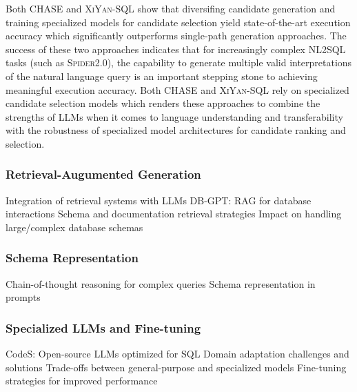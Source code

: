 \documentclass{article}
\begin{document}
Both CHASE and \textsc{XiYan-SQL} show that diversifing candidate generation and training specialized models for candidate
selection yield state-of-the-art execution accuracy which significantly outperforms single-path generation approaches.
The success of these two approaches indicates that for increasingly complex NL2SQL tasks (such as \textsc{Spider2.0}),
the capability to generate multiple valid interpretations of the natural language query is an important stepping stone
to achieving meaningful execution accuracy. Both CHASE and \textsc{XiYan-SQL} rely on specialized candidate selection
models which renders these approaches to combine the strengths of LLMs when it comes to language understanding and
transferability with the robustness of specialized model architectures for candidate ranking and selection.

\vspace{5cm}


\subsubsection{Retrieval-Augumented Generation}

Integration of retrieval systems with LLMs
DB-GPT: RAG for database interactions \citep{DBGPT}
Schema and documentation retrieval strategies
Impact on handling large/complex database schemas

\subsubsection{Schema Representation}

Chain-of-thought reasoning for complex queries
Schema representation in prompts



\subsubsection{Specialized LLMs and Fine-tuning}

CodeS: Open-source LLMs optimized for SQL \citep{CodeS}
Domain adaptation challenges and solutions \citep{ModelDomainAdaption}
Trade-offs between general-purpose and specialized models
Fine-tuning strategies for improved performance
\end{document}
